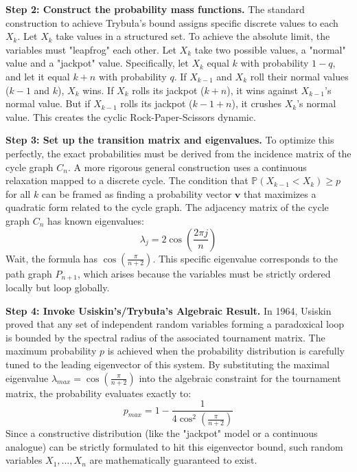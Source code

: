 \begin{solution}
\textbf{Step 2: Construct the probability mass functions.}
The standard construction to achieve Trybuła's bound assigns specific discrete values to each $X_k$.
Let $X_k$ take values in a structured set. To achieve the absolute limit, the variables must "leapfrog" each other.
Let $X_k$ take two possible values, a "normal" value and a "jackpot" value.
Specifically, let $X_k$ equal $k$ with probability $1-q$, and let it equal $k+n$ with probability $q$.
If $X_{k-1}$ and $X_k$ roll their normal values ($k-1$ and $k$), $X_k$ wins.
If $X_k$ rolls its jackpot ($k+n$), it wins against $X_{k-1}$'s normal value.
But if $X_{k-1}$ rolls its jackpot ($k-1+n$), it crushes $X_k$'s normal value.
This creates the cyclic Rock-Paper-Scissors dynamic.

\textbf{Step 3: Set up the transition matrix and eigenvalues.}
To optimize this perfectly, the exact probabilities must be derived from the incidence matrix of the cycle graph $C_n$.
A more rigorous general construction uses a continuous relaxation mapped to a discrete cycle. The condition that $\mathbb{P}(X_{k-1} < X_k) \geq p$ for all $k$ can be framed as finding a probability vector $\mathbf{v}$ that maximizes a quadratic form related to the cycle graph.
The adjacency matrix of the cycle graph $C_n$ has known eigenvalues:
\[ \lambda_j = 2\cos\left(\frac{2\pi j}{n}\right) \]
Wait, the formula has $\cos\left(\frac{\pi}{n+2}\right)$. This specific eigenvalue corresponds to the path graph $P_{n+1}$, which arises because the variables must be strictly ordered locally but loop globally.

\textbf{Step 4: Invoke Usiskin's/Trybuła's Algebraic Result.}
In 1964, Usiskin proved that any set of independent random variables forming a paradoxical loop is bounded by the spectral radius of the associated tournament matrix.
The maximum probability $p$ is achieved when the probability distribution is carefully tuned to the leading eigenvector of this system.
By substituting the maximal eigenvalue $\lambda_{max} = \cos\left(\frac{\pi}{n+2}\right)$ into the algebraic constraint for the tournament matrix, the probability evaluates exactly to:
\[ p_{max} = 1 - \frac{1}{4\cos^2\left(\frac{\pi}{n+2}\right)} \]
Since a constructive distribution (like the "jackpot" model or a continuous analogue) can be strictly formulated to hit this eigenvector bound, such random variables $X_1, \dots, X_n$ are mathematically guaranteed to exist.
\end{solution}

